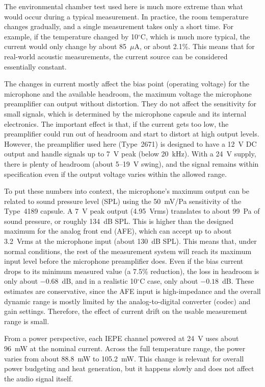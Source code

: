 The environmental chamber test used here is much more extreme than what would occur during a typical measurement. In practice, the room temperature changes gradually, and a single measurement takes only a short time. For example, if the temperature changed by 10$^\circ$C, which is much more typical, the current would only change by about 85~$\mu$A, or about 2.1\%. This means that for real-world acoustic measurements, the current source can be considered essentially constant.

The changes in current mostly affect the bias point (operating voltage) for the microphone and the available headroom, the maximum voltage the microphone preamplifier can output without distortion. They do not affect the sensitivity for small signals, which is determined by the microphone capsule and its internal electronics. The important effect is that, if the current gets too low, the preamplifier could run out of headroom and start to distort at high output levels. However, the preamplifier used here (Type~2671) is designed to have a 12~V DC output and handle signals up to 7~V peak (below 20~kHz). With a 24~V supply, there is plenty of headroom (about 5–19~V swing), and the signal remains within specification even if the output voltage varies within the allowed range.

To put these numbers into context, the microphone’s maximum output can be related to sound pressure level (SPL) using the 50~mV/Pa sensitivity of the Type~4189 capsule. A 7~V peak output (4.95~Vrms) translates to about 99~Pa of sound pressure, or roughly 134~dB SPL. This is higher than the designed maximum for the analog front end (AFE), which can accept up to about 3.2~Vrms at the microphone input (about 130~dB SPL). This means that, under normal conditions, the rest of the measurement system will reach its maximum input level before the microphone preamplifier does. Even if the bias current drops to its minimum measured value (a 7.5\% reduction), the loss in headroom is only about $-0.68$~dB, and in a realistic 10$^\circ$C case, only about $-0.18$~dB. These estimates are conservative, since the AFE input is high-impedance and the overall dynamic range is mostly limited by the analog-to-digital converter (codec) and gain settings. Therefore, the effect of current drift on the usable measurement range is small.

From a power perspective, each IEPE channel powered at 24~V uses about 96~mW at the nominal current. Across the full temperature range, the power varies from about 88.8~mW to 105.2~mW. This change is relevant for overall power budgeting and heat generation, but it happens slowly and does not affect the audio signal itself.


